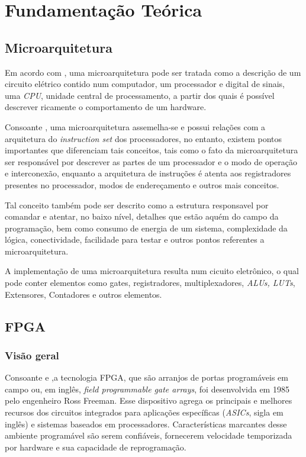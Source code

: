 \documentclass[
	11pt,				%
	openany,			%
	oneside,
	a4paper,			%
	chapter=TITLE,		%
	section=TITLE,		%
	english,			%
	brazil				%
	]{abntex2}
\begin{document}

\chapter{Fundamentação Teórica}
\section{Microarquitetura}
Em acordo com \cite{sorato}, uma microarquitetura pode ser tratada como a descrição de um circuito elétrico contido num computador, um processador e digital de sinais, uma \textit{CPU}, unidade central de processamento, a partir dos quais é possível descrever ricamente o comportamento de um hardware. 


Consoante \cite{sorato}, uma microarquitetura assemelha-se e possui relações com a arquitetura do \textit{instruction set} dos processadores, no entanto, existem pontos importantes que diferenciam tais conceitos, tais como o fato da microarquitetura ser responsável por descrever as partes de um processador e o modo de operação e interconexão, enquanto a arquitetura de instruções é atenta aos registradores presentes no processador, modos de endereçamento e outros mais conceitos.

Tal conceito também pode ser descrito como a estrutura responsavel por comandar e atentar, no baixo nível, detalhes que estão aquém do campo da programação, bem como consumo de energia de um sistema, complexidade da lógica, conectividade, facilidade para testar e outros pontos referentes a microarquitetura.  

A implementação de uma microarquitetura resulta num cicuito eletrônico, o qual pode conter elementos como gates, registradores, multiplexadores, \textit{ALUs, LUTs}, Extensores, Contadores e outros elementos.

\section{FPGA}
\subsection{Visão geral}
Consoante \cite{logicaprogramavel} e \cite{fundamentosfpga},a tecnologia FPGA, que são arranjos de portas programáveis em campo ou, em inglês, \textit{field programmable gate arrays}, foi desenvolvida em 1985 pelo engenheiro Ross Freeman. Esse dispositivo agrega os principais e melhores recursos dos circuitos integrados para aplicações específicas (\textit{ASICs}, sigla em inglês) e sistemas baseados em processadores. Características marcantes desse ambiente programável são serem confiáveis, fornecerem velocidade temporizada por hardware e sua capacidade de reprogramação.    
\end{document}
